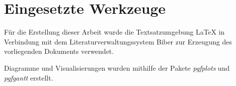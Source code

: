 \section{Eingesetzte Werkzeuge}

Für die Erstellung dieser Arbeit wurde die Textsatzumgebung \LaTeX{} in Verbindung mit dem Literaturverwaltungssystem Biber zur Erzeugung des vorliegenden Dokuments verwendet.


Diagramme und Visualisierungen wurden mithilfe der Pakete \textit{pgfplots} und \textit{pgfgantt} erstellt.
